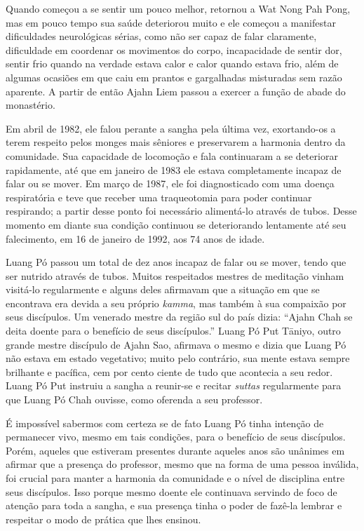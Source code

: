 Quando começou a se sentir um pouco melhor, retornou a Wat Nong Pah
Pong, mas em pouco tempo sua saúde deteriorou muito e ele começou a
manifestar dificuldades neurológicas sérias, como não ser capaz de falar
claramente, dificuldade em coordenar os movimentos do corpo,
incapacidade de sentir dor, sentir frio quando na verdade estava calor e
calor quando estava frio, além de algumas ocasiões em que caiu em
prantos e gargalhadas misturadas sem razão aparente. A partir de então
Ajahn Liem passou a exercer a função de abade do monastério.

Em abril de 1982, ele falou perante a sangha pela última vez,
exortando-os a terem respeito pelos monges mais sêniores e preservarem a
harmonia dentro da comunidade. Sua capacidade de locomoção e fala
continuaram a se deteriorar rapidamente, até que em janeiro de 1983 ele
estava completamente incapaz de falar ou se mover. Em março de 1987, ele
foi diagnosticado com uma doença respiratória e teve que receber uma
traqueotomia para poder continuar respirando; a partir desse ponto
foi necessário alimentá-lo através de tubos. Desse momento em
diante sua condição continuou se deteriorando lentamente até seu
falecimento, em 16 de janeiro de 1992, aos 74 anos de idade.

Luang Pó passou um total de dez anos incapaz de falar ou se mover, tendo
que ser nutrido através de tubos. Muitos respeitados mestres de
meditação vinham visitá-lo regularmente e alguns deles afirmavam que a
situação em que se encontrava era devida a seu próprio \emph{kamma}, mas
também à sua compaixão por seus discípulos. Um venerado mestre da região
sul do país dizia: ``Ajahn Chah se deita doente para o benefício de seus
discípulos.'' Luang Pó Put Tāniyo, outro grande mestre discípulo de
Ajahn Sao, afirmava o mesmo e dizia que Luang Pó não estava em estado
vegetativo; muito pelo contrário, sua mente estava sempre brilhante e
pacífica, cem por cento ciente de tudo que acontecia a seu redor. Luang
Pó Put instruiu a sangha a reunir-se e recitar \emph{suttas}
regularmente para que Luang Pó Chah ouvisse, como oferenda a seu
professor.

É impossível sabermos com certeza se de fato Luang Pó tinha intenção de
permanecer vivo, mesmo em tais condições, para o benefício de seus
discípulos. Porém, aqueles que estiveram presentes durante aqueles anos
são unânimes em afirmar que a presença do professor, mesmo que na forma
de uma pessoa inválida, foi crucial para manter a harmonia da comunidade
e o nível de disciplina entre seus \mbox{discípulos}. Isso porque mesmo doente
ele continuava servindo de foco de atenção para toda a sangha, e sua
presença tinha o poder de fazê-la lembrar e respeitar o modo de prática
que lhes ensinou.

